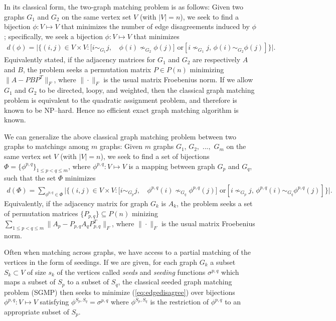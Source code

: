 \documentclass[12pt]{article}
\numberwithin{equation}{section}
\theoremstyle{definition}
\begin{document}
In its classical form, the two-graph matching problem is as follows:  Given two graphs $G_1$ and $G_2$ on the same vertex set $V$ (with $|V|=n$), we seek to find a bijection $\phi:V\mapsto V$ that minimizes the number of edge disagreements induced by $\phi$; specifically, we seek a bijection $\phi:V\mapsto  V$ that minimizes
\begin{align}
\label{eq:edgedisagree}
d(\phi)=\big|\big\{(i,j)\in V\times V: [i\sim_{G_{1}}j,&\,\phi(i)\nsim_{G_{2}}\phi(j)]\text{ or}[i\nsim_{G_{1}}j,\,\phi(i)\sim_{G_{2}}\phi(j)]\big\}\big|.
\end{align}
Equivalently stated, if the adjacency matrices for $G_1$ and $G_2$ are respectively $A$ and $B$, the problem seeks a permutation matrix $P\in P(n)$ minimizing $\| A-PBP^T\|_F$, where $\|\cdot\|_F$ is the usual matrix Froebenius norm.
If we allow $G_1$ and $G_2$ to be directed, loopy, and weighted, then the classical graph matching problem is equivalent to the quadratic assignment problem, and therefore is known to be NP--hard.  Hence no efficient exact graph matching algorithm is known.


We can generalize the above classical graph matching problem between two graphs to matchings among $m$ graphs:  Given $m$ graphs $G_1$, $G_2,$ $...,$ $G_m$ on the same vertex set $V$ (with $|V|=n$), we seek to find a set of bijections $\Phi=\{\phi^{p,q}\}_{1 \leq p < q \leq m}$, where $\phi^{p,q}:V\mapsto V$ is a mapping between graph $G_p$ and $G_q$, such that the set $\Phi$ minimizes
\begin{align}
\label{eq:edgedisagree2}
d(\Phi)=\sum\limits_{\phi^{p,q} \in \Phi} \big|\big\{(i,j)\in V\times V: [i\sim_{G_{p}}j,&\,\phi^{p,q}(i)\nsim_{G_{q}}\phi^{p,q}(j)]\text{ or}[i\nsim_{G_{p}}j,\,\phi^{p,q}(i)\sim_{G_{q}}\phi^{p,q}(j)]\big\}\big|.
\end{align}
Equivalently, if the adjacency matrix for graph $G_k$ is $A_k$, the problem seeks a set of permutation matrices $\{P_{p,q}\} \subseteq P(n)$ minizing $\sum\limits_{ 1\leq p < q \leq m} \| A_p-P_{p,q}A_qP_{p,q}^T\|_{F}$, where $\|\cdot\|_F$ is the usual matrix Froebenius norm.


Often when matching across graphs, we have access to a partial matching of the vertices in the form of seedings.
If we are given, for each graph $G_k$ a subset $S_{k}\subset V$ of size $s_k$ of the vertices called {\it seeds} and {\it seeding} functions
 $\sigma^{p,q}$ which maps a subset of $S_p$ to a subset of $S_q$, the classical seeded graph matching problem (SGMP) then seeks to minimize (\ref{eq:edgedisagree}) over bijections $\phi^{p,q}:V\mapsto V$ satisfying $\phi^{S_p,S_q}=\sigma^{p,q}$ where $\phi^{S_p,S_q}$ is the restriction of $\phi^{p,q}$ to an appropriate subset of $S_p$.
\end{document}

